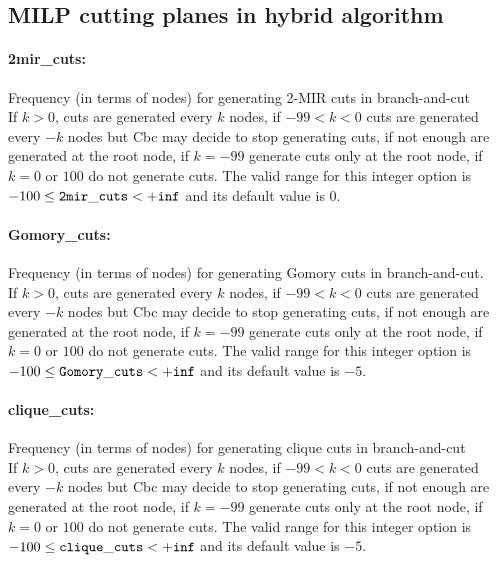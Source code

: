 \subsection{MILP cutting planes in hybrid algorithm}
\label{sec:MILPcuttingplanesinhybridalgorithm}
\paragraph{2mir\_cuts:}\label{opt:2mir_cuts} Frequency (in terms of nodes) for generating 2-MIR cuts in branch-and-cut \\
 If $k > 0$, cuts are generated every $k$ nodes, if $-99 < k < 0$ cuts are generated every $-k$ nodes but Cbc may decide to stop generating cuts, if not enough are generated at the root node, if $k=-99$ generate cuts only at the root node, if $k=0$ or $100$ do not generate cuts. The valid range for this integer option is
$-100 \le {\tt 2mir\_cuts } <  {\tt +inf}$
and its default value is $0$.


\paragraph{Gomory\_cuts:}\label{opt:Gomory_cuts} Frequency (in terms of nodes) for generating Gomory cuts in branch-and-cut. \\
 If $k > 0$, cuts are generated every $k$ nodes, if $-99 < k < 0$ cuts are generated every $-k$ nodes but Cbc may decide to stop generating cuts, if not enough are generated at the root node, if $k=-99$ generate cuts only at the root node, if $k=0$ or $100$ do not generate cuts. The valid range for this integer option is
$-100 \le {\tt Gomory\_cuts } <  {\tt +inf}$
and its default value is $-5$.


\paragraph{clique\_cuts:}\label{opt:clique_cuts} Frequency (in terms of nodes) for generating clique cuts in branch-and-cut \\
 If $k > 0$, cuts are generated every $k$ nodes, if $-99 < k < 0$ cuts are generated every $-k$ nodes but Cbc may decide to stop generating cuts, if not enough are generated at the root node, if $k=-99$ generate cuts only at the root node, if $k=0$ or $100$ do not generate cuts. The valid range for this integer option is
$-100 \le {\tt clique\_cuts } <  {\tt +inf}$
and its default value is $-5$.


